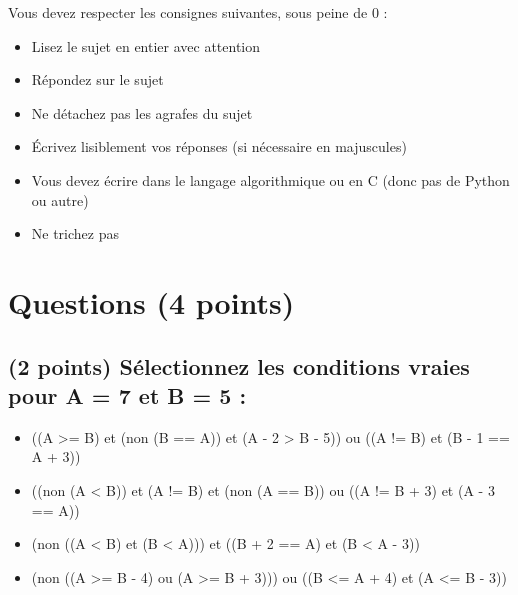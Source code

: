 \documentclass[11pt,a4paper]{article}
\begin{document}
\MakeExamTitle                   %


\bigskip

Vous devez respecter les consignes suivantes, sous peine de 0 :

\begin{itemize}
\item Lisez le sujet en entier avec attention
\item Répondez sur le sujet
\item Ne détachez pas les agrafes du sujet
\item \'Ecrivez lisiblement vos réponses (si nécessaire en majuscules)
\item Vous devez écrire dans le langage algorithmique ou en C (donc pas de Python ou autre)
\item Ne trichez pas
\end{itemize}


\vfillFirst


\section{Questions (4 points)}

\subsection{(2 points) Sélectionnez les conditions vraies pour A = 7 et B = 5 : }

\bigskip

\begin{itemize}
  \item[\CaseCoche] ((A >= B) et (non (B == A)) et (A - 2 > B - 5)) ou ((A != B) et (B - 1 == A + 3)) \\ %
  \item[\CaseCoche] ((non (A < B)) et (A != B) et (non (A == B)) ou ((A != B + 3) et (A - 3 == A)) \\ %
  \item[\CaseCoche] (non ((A < B) et (B < A))) et ((B + 2 == A) et (B < A - 3)) \\ %
  \item[\CaseCoche] (non ((A >= B - 4) ou (A >= B + 3))) ou ((B <= A + 4) et (A <= B - 3)) \\ %
\end{itemize}
\end{document}
